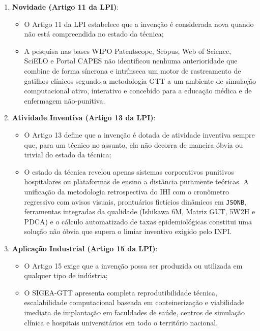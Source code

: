 \begin{enumerate}
    \item \textbf{Novidade (Artigo 11 da LPI)}:
    \begin{itemize}
        \item O Artigo 11 da LPI estabelece que a invenção é considerada nova quando não está compreendida no estado da técnica;
        \item A pesquisa nas bases WIPO Patentscope, Scopus, Web of Science, SciELO e Portal CAPES não identificou nenhuma anterioridade que combine de forma síncrona e intrínseca um motor de rastreamento de gatilhos clínicos segundo a metodologia GTT a um ambiente de simulação computacional ativo, interativo e concebido para a educação médica e de enfermagem não-punitiva.
    \end{itemize}

    \item \textbf{Atividade Inventiva (Artigo 13 da LPI)}:
    \begin{itemize}
        \item O Artigo 13 define que a invenção é dotada de atividade inventiva sempre que, para um técnico no assunto, ela não decorra de maneira óbvia ou trivial do estado da técnica;
        \item O estado da técnica revelou apenas sistemas corporativos punitivos hospitalares ou plataformas de ensino a distância puramente teóricas. A unificação da metodologia retrospectiva do IHI com o cronômetro regressivo com avisos visuais, prontuários fictícios dinâmicos em \texttt{JSONB}, ferramentas integradas da qualidade (Ishikawa 6M, Matriz GUT, 5W2H e PDCA) e o cálculo automatizado de taxas epidemiológicas constitui uma solução não óbvia que supera o limiar inventivo exigido pelo INPI.
    \end{itemize}

    \item \textbf{Aplicação Industrial (Artigo 15 da LPI)}:
    \begin{itemize}
        \item O Artigo 15 exige que a invenção possa ser produzida ou utilizada em qualquer tipo de indústria;
        \item O SIGEA-GTT apresenta completa reprodutibilidade técnica, escalabilidade computacional baseada em conteinerização e viabilidade imediata de implantação em faculdades de saúde, centros de simulação clínica e hospitais universitários em todo o território nacional.
    \end{itemize}
\end{enumerate}

